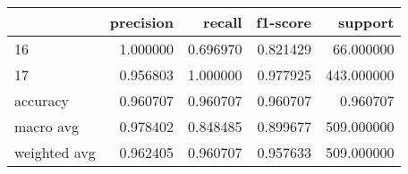 \begin{tabular}{lrrrr}
\toprule
 & precision & recall & f1-score & support \\
\midrule
16 & 1.000000 & 0.696970 & 0.821429 & 66.000000 \\
17 & 0.956803 & 1.000000 & 0.977925 & 443.000000 \\
accuracy & 0.960707 & 0.960707 & 0.960707 & 0.960707 \\
macro avg & 0.978402 & 0.848485 & 0.899677 & 509.000000 \\
weighted avg & 0.962405 & 0.960707 & 0.957633 & 509.000000 \\
\bottomrule
\end{tabular}
